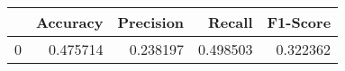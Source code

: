 \begin{tabular}{lrrrr}
\toprule
{} &  Accuracy &  Precision &    Recall &  F1-Score \\
\midrule
0 &  0.475714 &   0.238197 &  0.498503 &  0.322362 \\
\bottomrule
\end{tabular}
